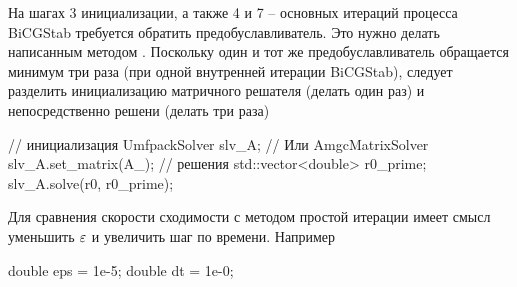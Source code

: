 \begin{itemize}
На шагах 3 инициализации, а также 4 и 7 -- основных итераций процесса BiCGStab
требуется обратить предобуславливатель. Это нужно делать
написанным методом .
Поскольку один и тот же предобуславливатель
обращается минимум три раза (при одной внутренней итерации BiCGStab), следует разделить инициализацию
матричного решателя (делать один раз) и непосредственно решени (делать три раза)
\begin{cppcode}
// инициализация
UmfpackSolver slv_A; // Или AmgcMatrixSolver
slv_A.set_matrix(A_);
// решения
std::vector<double> r0_prime;
slv_A.solve(r0, r0_prime);
\end{cppcode}

Для сравнения скорости сходимости с методом простой итерации имеет смысл 
уменьшить $\varepsilon$  и увеличить шаг по времени. Например 
\begin{cppcode}
double eps = 1e-5;
double dt = 1e-0;
\end{cppcode}

\end{itemize}
